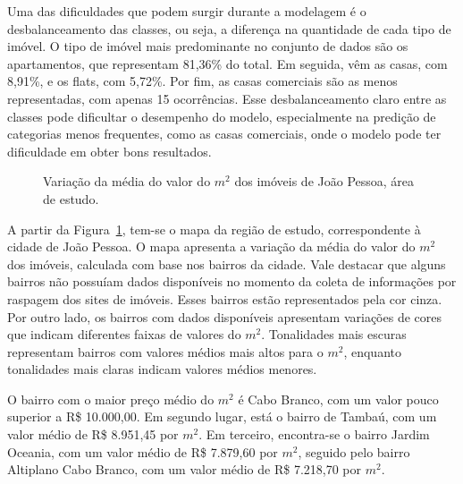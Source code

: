 \documentclass[
  12pt,
  a4paper,
]{scrreprt}
\begin{document}
\vspace{12pt}

Uma das dificuldades que podem surgir durante a modelagem é o
desbalanceamento das classes, ou seja, a diferença na quantidade de cada
tipo de imóvel. O tipo de imóvel mais predominante no conjunto de dados
são os apartamentos, que representam 81,36\% do total. Em seguida, vêm
as casas, com 8,91\%, e os flats, com 5,72\%. Por fim, as casas
comerciais são as menos representadas, com apenas 15 ocorrências. Esse
desbalanceamento claro entre as classes pode dificultar o desempenho do
modelo, especialmente na predição de categorias menos frequentes, como
as casas comerciais, onde o modelo pode ter dificuldade em obter bons
resultados.

\begin{figure}


\caption{\label{fig-mapa_valor}Variação da média do valor do \(m^2\) dos
imóveis de João Pessoa, área de estudo.}

\end{figure}%

A partir da Figura~\ref{fig-mapa_valor}, tem-se o mapa da região de
estudo, correspondente à cidade de João Pessoa. O mapa apresenta a
variação da média do valor do \(m^2\) dos imóveis, calculada com base
nos bairros da cidade. Vale destacar que alguns bairros não possuíam
dados disponíveis no momento da coleta de informações por raspagem dos
sites de imóveis. Esses bairros estão representados pela cor cinza. Por
outro lado, os bairros com dados disponíveis apresentam variações de
cores que indicam diferentes faixas de valores do \(m^2\). Tonalidades
mais escuras representam bairros com valores médios mais altos para o
\(m^2\), enquanto tonalidades mais claras indicam valores médios
menores.

\vspace{12pt}

O bairro com o maior preço médio do \(m^2\) é Cabo Branco, com um valor
pouco superior a R\$ 10.000,00. Em segundo lugar, está o bairro de
Tambaú, com um valor médio de R\$ 8.951,45 por \(m^2\). Em terceiro,
encontra-se o bairro Jardim Oceania, com um valor médio de R\$ 7.879,60
por \(m^2\), seguido pelo bairro Altiplano Cabo Branco, com um valor
médio de R\$ 7.218,70 por \(m^2\).

\vspace{12pt}
\end{document}
